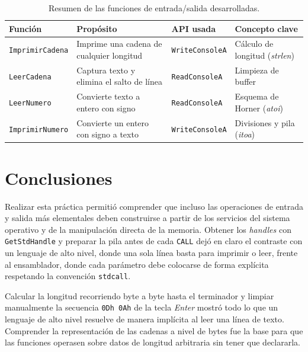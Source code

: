 \documentclass[a4paper,12pt]{article}
\begin{document}
\begin{table}[H]
\centering
\caption{Resumen de las funciones de entrada/salida desarrolladas.}
\label{tab:resumen_func}
\small
\renewcommand{\arraystretch}{1.25}
\begin{tabular}{
    >{\raggedright\arraybackslash}p{3.0cm}
    >{\raggedright\arraybackslash}p{4.6cm}
    >{\raggedright\arraybackslash}p{2.6cm}
    >{\raggedright\arraybackslash}p{2.4cm}
}
\toprule
\rowcolor{VerdeUABC}
\color{white}\textbf{Función} &
\color{white}\textbf{Propósito} &
\color{white}\textbf{API usada} &
\color{white}\textbf{Concepto clave} \\
\midrule
\rowcolor{rowLight}
\texttt{ImprimirCadena} & Imprime una cadena de cualquier longitud & \texttt{WriteConsoleA} & Cálculo de longitud (\textit{strlen}) \\
\texttt{LeerCadena} & Captura texto y elimina el salto de línea & \texttt{ReadConsoleA} & Limpieza de buffer \\
\rowcolor{rowLight}
\texttt{LeerNumero} & Convierte texto a entero con signo & \texttt{ReadConsoleA} & Esquema de Horner (\textit{atoi}) \\
\texttt{ImprimirNumero} & Convierte un entero con signo a texto & \texttt{WriteConsoleA} & Divisiones y pila (\textit{itoa}) \\
\bottomrule
\end{tabular}
\end{table}

\section{Conclusiones}
Realizar esta práctica permitió comprender que incluso las operaciones de entrada y salida más elementales deben construirse a partir de los servicios del sistema operativo y de la manipulación directa de la memoria. Obtener los \textit{handles} con \texttt{GetStdHandle} y preparar la pila antes de cada \texttt{CALL} dejó en claro el contraste con un lenguaje de alto nivel, donde una sola línea basta para imprimir o leer, frente al ensamblador, donde cada parámetro debe colocarse de forma explícita respetando la convención \texttt{stdcall}.

Calcular la longitud recorriendo byte a byte hasta el terminador y limpiar manualmente la secuencia \texttt{0Dh 0Ah} de la tecla \textit{Enter} mostró todo lo que un lenguaje de alto nivel resuelve de manera implícita al leer una línea de texto. Comprender la representación de las cadenas a nivel de bytes fue la base para que las funciones operasen sobre datos de longitud arbitraria sin tener que declararla.
\end{document}
